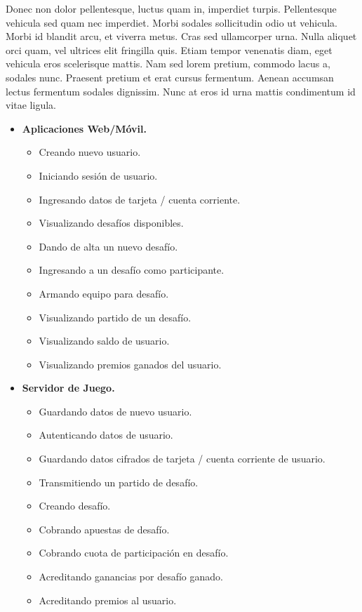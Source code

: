 \documentclass[a4paper, 10pt, twoside]{article}
\begin{document}
Donec non dolor pellentesque, luctus quam in, imperdiet turpis. Pellentesque vehicula sed quam nec imperdiet. Morbi sodales sollicitudin odio ut vehicula. Morbi id blandit arcu, et viverra metus. Cras sed ullamcorper urna. Nulla aliquet orci quam, vel ultrices elit fringilla quis. Etiam tempor venenatis diam, eget vehicula eros scelerisque mattis. Nam sed lorem pretium, commodo lacus a, sodales nunc. Praesent pretium et erat cursus fermentum. Aenean accumsan lectus fermentum sodales dignissim. Nunc at eros id urna mattis condimentum id vitae ligula.

\begin{itemize}

  \item \textbf{Aplicaciones Web/Móvil.}
  \begin{itemize}
    \item Creando nuevo usuario.
    \item Iniciando sesión de usuario.
    \item Ingresando datos de tarjeta / cuenta corriente.
    \item Visualizando desafíos disponibles.
    \item Dando de alta un nuevo desafío.
    \item Ingresando a un desafío como participante.
    \item Armando equipo para desafío.
    \item Visualizando partido de un desafío.
    \item Visualizando saldo de usuario.
    \item Visualizando premios ganados del usuario.
  \end{itemize}

  \item \textbf{Servidor de Juego.}
  \begin{itemize}
    \item Guardando datos de nuevo usuario.
    \item Autenticando datos de usuario.
    \item Guardando datos cifrados de tarjeta / cuenta corriente de usuario.
    \item Transmitiendo un partido de desafío.
    \item Creando desafío.
    \item Cobrando apuestas de desafío.
    \item Cobrando cuota de participación en desafío.
    \item Acreditando ganancias por desafío ganado.
    \item Acreditando premios al usuario.
  \end{itemize}


\end{itemize}
\end{document}
